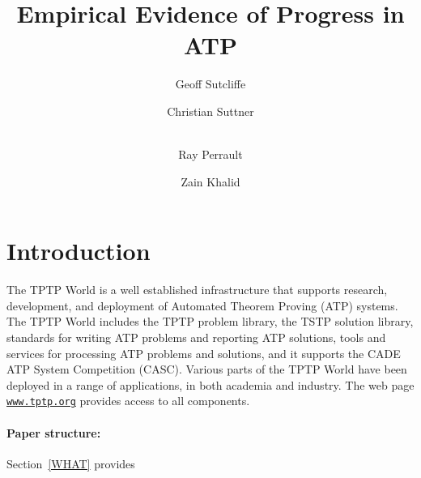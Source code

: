 \documentclass[runningheads]{llncs}
\begin{document}
\title{Empirical Evidence of Progress in ATP}

\author{
Geoff Sutcliffe
\and
Christian Suttner
\and \\
Ray Perrault\orcidID{}
\and
Zain Khalid
}

\maketitle
\begin{abstract}

\end{abstract}
\section{Introduction}
\label{Introduction}

The TPTP World \cite{Sut17} is a well established infrastructure that supports research, 
development, and deployment of Automated Theorem Proving (ATP) systems.
The TPTP World includes the TPTP problem library,
the TSTP solution library,
standards for writing ATP problems and reporting ATP solutions,
tools and services for processing ATP problems and solutions,
and it supports the CADE ATP System Competition (CASC).
Various parts of the TPTP World have been deployed in a range of applications,
in both academia and industry.
The web page \href{https://www.tptp.org}{\tt www.tptp.org} provides access to all 
components.

\paragraph{Paper structure:}
Section~\ref{WHAT} provides 

\end{document}
